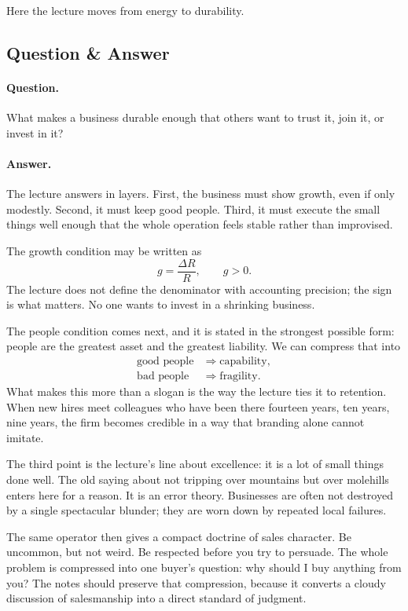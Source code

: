 Here the lecture moves from energy to durability.

\subsection{Question \& Answer}

\paragraph{Question.} What makes a business durable enough that others want to trust it, join it, or invest in it?

\paragraph{Answer.} The lecture answers in layers. First, the business must show growth, even if only modestly. Second, it must keep good people. Third, it must execute the small things well enough that the whole operation feels stable rather than improvised.

The growth condition may be written as
\begin{equation}
g = \frac{\Delta R}{R},
\qquad
g>0.
\end{equation}
The lecture does not define the denominator with accounting precision; the sign is what matters. No one wants to invest in a shrinking business.

The people condition comes next, and it is stated in the strongest possible form: people are the greatest asset and the greatest liability. We can compress that into
\begin{align}
\text{good people} &\Rightarrow \text{capability}, \\
\text{bad people} &\Rightarrow \text{fragility}.
\end{align}
What makes this more than a slogan is the way the lecture ties it to retention. When new hires meet colleagues who have been there fourteen years, ten years, nine years, the firm becomes credible in a way that branding alone cannot imitate.

The third point is the lecture's line about excellence: it is a lot of small things done well. The old saying about not tripping over mountains but over molehills enters here for a reason. It is an error theory. Businesses are often not destroyed by a single spectacular blunder; they are worn down by repeated local failures.

The same operator then gives a compact doctrine of sales character. Be uncommon, but not weird. Be respected before you try to persuade. The whole problem is compressed into one buyer's question: why should I buy anything from you? The notes should preserve that compression, because it converts a cloudy discussion of salesmanship into a direct standard of judgment.

